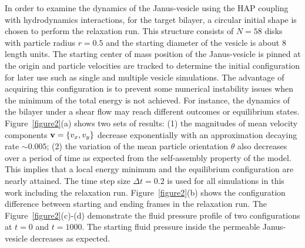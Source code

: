 \documentclass[lineno]{jfm}
\begin{document}
In order to examine the dynamics of the Janus-vesicle using the HAP coupling with hydrodynamics interactions, for the target bilayer, a circular initial shape is chosen to perform the relaxation run. 
This structure consists of $N=58$ disks with particle radius $r=0.5$ and the starting diameter of 
the vesicle is about $8$ length units.
The starting center of mass position of the Janus-vesicle is pinned at the origin and particle velocities are tracked to determine the initial configuration for later use such as single and multiple vesicle simulations. 
The advantage of acquiring this configuration is to prevent some numerical instability issues when the minimum of the total energy is not achieved. 
For instance, the dynamics of the bilayer under a shear flow may reach different outcomes or equilibrium states.
Figure~\ref{figure2}(a) shows two sets of results: (1) the magnitudes of mean velocity components 
${\bf v}=\{v_x,v_y\}$ decrease exponentially with an approximation decaying rate $\sim0.005$; (2) the variation of the mean particle orientation $\theta$ also decreases over a period of time as expected from the self-assembly property of the model. This implies that a local energy minimum and the equilibrium configuration are nearly attained. 
The time step size $\Delta t=0.2$ is used for all simulations in this work including the relaxation run.
Figure~\ref{figure2}(b) shows the configuration difference between starting and ending frames in the relaxation run. The Figure~\ref{figure2}(c)-(d) demonstrate the fluid pressure profile of two configurations at $t=0$ and $t=1000$. The starting fluid pressure inside the permeable Janus-vesicle decreases as expected.
\end{document}
